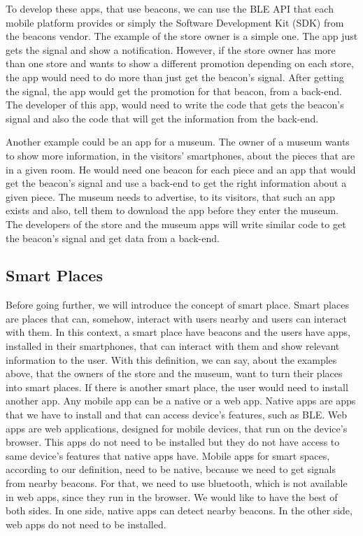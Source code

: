 To develop these apps, that use beacons, we can use the 
BLE API that each 
mobile platform provides or simply the Software
Development Kit (SDK) from the 
beacons vendor. The example of the store owner is a
simple one. The app just gets the signal and show a 
notification. However, if the store owner has more than
one store and wants to show a different promotion depending
on each store, the app would need to do more than just get
the beacon's signal. After getting the signal, the app
would get the promotion for that beacon, from a 
back-end. The developer of this app, would need to
write the code that gets the beacon's signal and also
the code that will get the information from the back-end.

Another example could be an app for a museum. The owner
of a museum wants to show more information, in the 
visitors' smartphones, about the pieces that are in a given
room. He would need one beacon for each piece and an app
that would get the beacon's signal and use a
back-end to get the right information about a given piece.
The museum needs to advertise, to its visitors, that such
an app exists and also, tell them to download the app
before they enter the museum. The developers of the
store and the museum apps will write similar code to get
the beacon's signal and get data from a back-end.

\subsection{Smart Places}
\label{sub:smart_places}
Before going further, we will introduce the concept of
smart place. Smart places are places that can, somehow,
interact with users nearby and users can interact 
with them.
In this context, a smart place have beacons and the users
have apps, installed in their smartphones, that can interact
with them and show relevant information to the user.
With this definition, we can say, about the examples above,
that the owners of the store and the museum, want to
turn their places into smart places.
If there is another smart place, the user would need to
install another app.
Any mobile app can be a native or a web app. Native apps
are apps that we have to install and that can access
device's features, such as BLE. Web apps are web
applications, designed for mobile devices, that run
on the device's browser. This apps do not need to be
installed but they do not have access
to same device's features that native apps have.
Mobile apps for smart spaces, according to our definition,
need to be native, because we need to get signals from
nearby beacons. For that, we need to use bluetooth, which is
not available in web apps, since they run in the browser.
We would like to have the best of both sides. In one side,
native apps can detect nearby beacons. In the other side,
web apps do not need to be installed.

